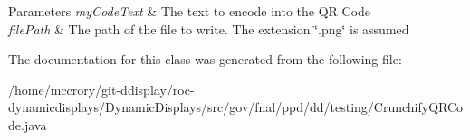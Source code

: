 \begin{DoxyParams}{Parameters}
{\em my\-Code\-Text} & The text to encode into the Q\-R Code \\
\hline
{\em file\-Path} & The path of the file to write. The extension \char`\"{}.\-png\char`\"{} is assumed \\
\hline
\end{DoxyParams}


The documentation for this class was generated from the following file\-:\begin{DoxyCompactItemize}
\item 
/home/mccrory/git-\/ddisplay/roc-\/dynamicdisplays/\-Dynamic\-Displays/src/gov/fnal/ppd/dd/testing/Crunchify\-Q\-R\-Code.\-java\end{DoxyCompactItemize}
